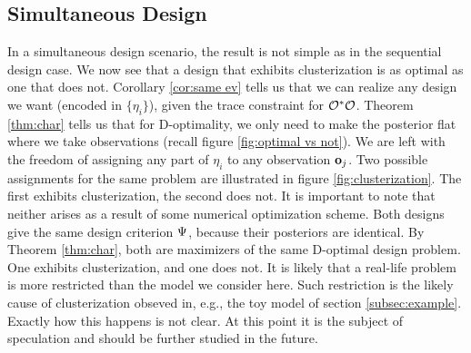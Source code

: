 \subsection{Simultaneous Design}\label{subsec:clusterization simultaneous}
In a simultaneous design scenario, the result is not simple as in the
sequential design case. We now see that a design that exhibits
clusterization is as optimal as one that does not. Corollary
\ref{cor:same ev} tells us that we can realize any design we want
(encoded in $\{\eta_i\}$), given the trace constraint for
$\mathcal{O}^*\mathcal{O}$. Theorem \ref{thm:char} tells us that for D-optimality,
we only need to make the posterior flat where we take observations
(recall figure \ref{fig:optimal vs not}). We are left with the freedom
of assigning any part of $\eta_i$ to any observation $\mathbf{o}_j$. Two
possible assignments for the same problem are illustrated in figure
\ref{fig:clusterization}. The first exhibits clusterization, the
second does not. It is important to note that neither arises as a
result of some numerical optimization scheme. Both designs give the
same design criterion $\Psi$, because their posteriors are
identical. By Theorem \ref{thm:char}, both are maximizers of the same
D-optimal design problem. One exhibits clusterization, and one does
not. It is likely that a real-life problem is more restricted than the
model we consider here. Such restriction is the likely cause of
clusterization obseved in, e.g., the toy model of section
\ref{subsec:example}. Exactly how this happens is not clear. At this
point it is the subject of speculation and should be further studied
in the future.


